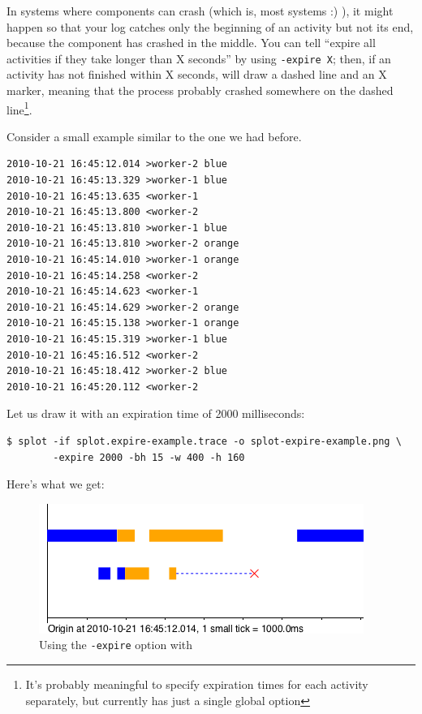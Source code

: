 \documentclass{article}
\begin{document}
In systems where components can crash (which is, most systems :) ), it might happen so that your log catches only the beginning of an activity but not its end, because the component has crashed in the middle. You can tell \splot{} ``expire all activities if they take longer than X seconds'' by using \verb|-expire X|; then, if an activity has not finished within X seconds, \splot{} will draw a dashed line and an X marker, meaning that the process probably crashed somewhere on the dashed line\footnote{It's probably meaningful to specify expiration times for each activity separately, but currently \splot{} has just a single global option}.

Consider a small example similar to the one we had before.

\begin{verbatim}
2010-10-21 16:45:12.014 >worker-2 blue
2010-10-21 16:45:13.329 >worker-1 blue
2010-10-21 16:45:13.635 <worker-1
2010-10-21 16:45:13.800 <worker-2
2010-10-21 16:45:13.810 >worker-1 blue
2010-10-21 16:45:13.810 >worker-2 orange
2010-10-21 16:45:14.010 >worker-1 orange
2010-10-21 16:45:14.258 <worker-2
2010-10-21 16:45:14.623 <worker-1
2010-10-21 16:45:14.629 >worker-2 orange
2010-10-21 16:45:15.138 >worker-1 orange
2010-10-21 16:45:15.319 >worker-1 blue
2010-10-21 16:45:16.512 <worker-2
2010-10-21 16:45:18.412 >worker-2 blue
2010-10-21 16:45:20.112 <worker-2
\end{verbatim}

Let us draw it with an expiration time of 2000 milliseconds:

\begin{verbatim}
$ splot -if splot.expire-example.trace -o splot-expire-example.png \
        -expire 2000 -bh 15 -w 400 -h 160
\end{verbatim}

Here's what we get:

\begin{figure}[h!]
\center
\includegraphics[scale=0.5]{pics/splot/splot-expire-example.png}
\caption{Using the \texttt{-expire} option with \splot{}}
\end{figure}
\end{document}
